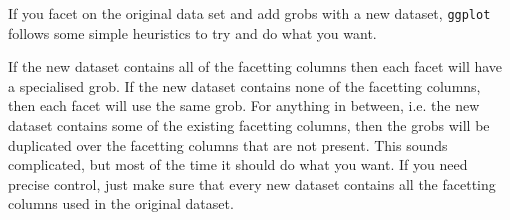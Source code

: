 If you facet on the original data set and add grobs with a new dataset, {\tt ggplot} follows some simple heuristics to try and do what you want.  

If the new dataset contains all of the facetting columns then each facet will have a specialised grob. If the new dataset contains none of the facetting columns, then each facet will use the same grob.  For anything in between, i.e. the new dataset contains some of the existing facetting columns, then the grobs will be duplicated over the facetting columns that are not present.  This sounds complicated, but most of the time it should do what you want.  If you need precise control, just make sure that every new dataset contains all the facetting columns used in the original dataset.



